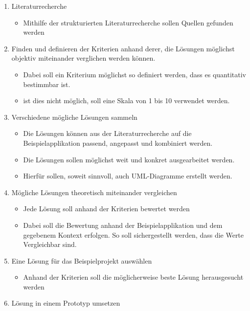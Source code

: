 \begin{enumerate}
  \item Literaturrecherche
  \begin{itemize}
    \item Mithilfe der strukturierten Literaturrecherche sollen Quellen gefunden werden
  \end{itemize}
\item
  Finden und definieren der Kriterien anhand derer, die Lösungen möglichst objektiv
  miteinander verglichen werden können.

  \begin{itemize}
  \item
    Dabei soll ein Kriterium möglichst so definiert werden, dass es
    quantitativ bestimmbar ist.
  \item
    ist dies nicht möglich, soll eine Skala von 1 bis 10 verwendet
    werden.
  \end{itemize}
\item
  Verschiedene mögliche Lösungen sammeln

  \begin{itemize}
    \item Die Lösungen können aus der Literaturrecherche auf die Beispielapplikation passend, angepasst und kombiniert werden.
  \item
    Die Lösungen sollen möglichst weit und konkret ausgearbeitet werden.
  \item
    Hierfür sollen, soweit sinnvoll, auch UML-Diagramme erstellt werden.
  \end{itemize}
\item
  Mögliche Lösungen theoretisch miteinander vergleichen

  \begin{itemize}
  \item
    Jede Lösung soll anhand der Kriterien bewertet werden
  \item
    Dabei soll die Bewertung anhand der Beispielapplikation und dem
    gegebenem Kontext erfolgen.
    So soll sichergestellt werden, dass die
    Werte Vergleichbar sind.
  \end{itemize}
\item Eine Lösung für das Beispielprojekt auswählen

  \begin{itemize}
  \item
    Anhand der Kriterien soll die möglicherweise beste Lösung herausgesucht werden
  \end{itemize}
\item
  Lösung in einem Prototyp umsetzen


\end{enumerate}
